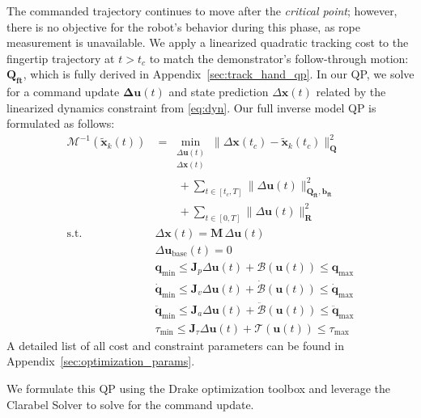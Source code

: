 \documentclass[conference]{IEEEtran}
\newcommand{\command}{\mathbf{u}}
\newcommand{\state}{\mathbf{x}}
\newcommand{\commandt}{\mathbf{u}(t)}
\newcommand{\statet}{\mathbf{x}(t)}
\newcommand{\commandupdate}{\mathbf{\Delta u}(t)}
\newcommand{\invmodel}{\mathcal{M}^{-1}}
\begin{document}
The commanded trajectory continues to move after the \textit{critical point}; however, there is no objective for the robot's behavior during this phase, as rope measurement is unavailable. We apply a linearized quadratic tracking cost to the fingertip trajectory at $t>t_c$ to match the demonstrator's follow-through motion: $\mathbf{Q_{ft}}$, which is fully derived in Appendix~\cref{sec:track_hand_qp}.
In our QP, we solve for a command update $\commandupdate$ and state prediction $\Delta\statet$ related by the linearized dynamics constraint from \cref{eq:dyn}. Our full inverse model QP is formulated as follows:
\begin{subequations}\label{eq:inverse_model_qp}
\begin{align}
\invmodel(\tilde{\state}_k(t)) &=\min_{\substack{\Delta\commandt\\ \Delta\statet}}
\bigl\|\Delta\state(t_c) - \tilde{\state}_k(t_c)\bigr\|_{\mathbf{Q}}^{2} \\
&\qquad+ 
\sum_{t\in[t_c,T]}
  \|\Delta\commandt\|_{\mathbf{Q_{ft}}, \mathbf{b_{ft}}}^{2}\nonumber\\
&\qquad +\sum_{t\in[0,T]}
  \|\Delta\commandt\|_{\mathbf{R}}^{2}\nonumber\\
\text{s.t.}\quad
& \Delta\statet = \mathbf{M}\,\Delta\commandt \\
& \Delta\command_{\text{base}}(t) = 0 \label{eq:base}\\
& \mathbf{q}_{\text{min}} \leq \mathbf{J}_p\Delta\commandt + \mathcal{B}(\commandt) \leq \mathbf{q}_{\text{max}} \\
& \mathbf{\dot q}_{\text{min}} \leq \mathbf{J}_v\Delta\commandt + \dot{\mathcal{B}}(\commandt) \leq \mathbf{\dot q}_{\text{max}} \\
& \mathbf{\ddot q}_{\text{min}} \leq \mathbf{J}_a\Delta\commandt + \ddot {\mathcal{B}}(\commandt) \leq \mathbf{\ddot q}_{\text{max}} \\
& \tau_{\text{min}} \leq \mathbf{J}_\tau\Delta\commandt + \mathcal{T}(\commandt) \leq \tau_{\text{max}}
\end{align}
\end{subequations}
A detailed list of all cost and constraint parameters can be found in Appendix~\cref{sec:optimization_params}.

We formulate this QP using the Drake optimization toolbox \cite{drake} and leverage the Clarabel Solver \cite{Clarabel_2024} to solve for the command update. 
\end{document}
